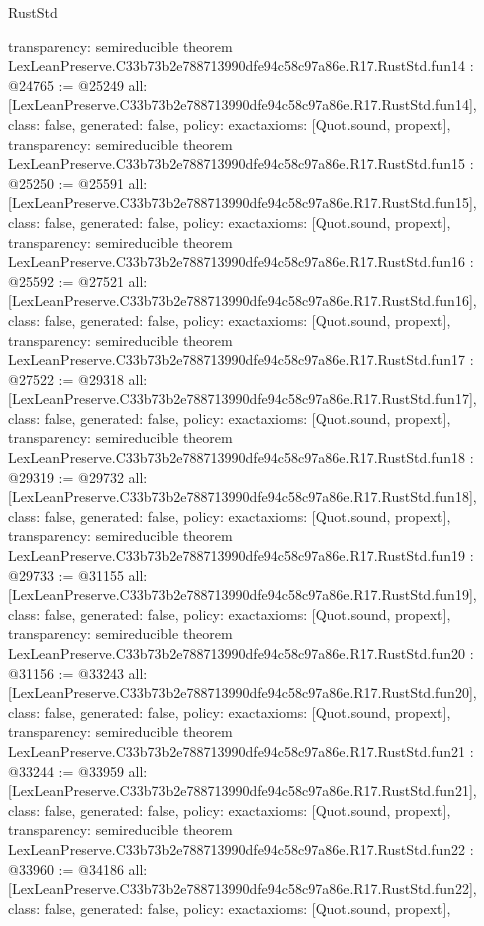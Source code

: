 \begin{lexlean}{RustStd}
\begin{coremodule}
{  transparency: semireducible
}
theorem LexLeanPreserve.C33b73b2e788713990dfe94c58c97a86e.R17.RustStd.fun14 : @24765 := @25249 {
  all: [LexLeanPreserve.C33b73b2e788713990dfe94c58c97a86e.R17.RustStd.fun14],
  class: false,
  generated: false,
  policy: exact{axioms: [Quot.sound, propext]},
  transparency: semireducible
}
theorem LexLeanPreserve.C33b73b2e788713990dfe94c58c97a86e.R17.RustStd.fun15 : @25250 := @25591 {
  all: [LexLeanPreserve.C33b73b2e788713990dfe94c58c97a86e.R17.RustStd.fun15],
  class: false,
  generated: false,
  policy: exact{axioms: [Quot.sound, propext]},
  transparency: semireducible
}
theorem LexLeanPreserve.C33b73b2e788713990dfe94c58c97a86e.R17.RustStd.fun16 : @25592 := @27521 {
  all: [LexLeanPreserve.C33b73b2e788713990dfe94c58c97a86e.R17.RustStd.fun16],
  class: false,
  generated: false,
  policy: exact{axioms: [Quot.sound, propext]},
  transparency: semireducible
}
theorem LexLeanPreserve.C33b73b2e788713990dfe94c58c97a86e.R17.RustStd.fun17 : @27522 := @29318 {
  all: [LexLeanPreserve.C33b73b2e788713990dfe94c58c97a86e.R17.RustStd.fun17],
  class: false,
  generated: false,
  policy: exact{axioms: [Quot.sound, propext]},
  transparency: semireducible
}
theorem LexLeanPreserve.C33b73b2e788713990dfe94c58c97a86e.R17.RustStd.fun18 : @29319 := @29732 {
  all: [LexLeanPreserve.C33b73b2e788713990dfe94c58c97a86e.R17.RustStd.fun18],
  class: false,
  generated: false,
  policy: exact{axioms: [Quot.sound, propext]},
  transparency: semireducible
}
theorem LexLeanPreserve.C33b73b2e788713990dfe94c58c97a86e.R17.RustStd.fun19 : @29733 := @31155 {
  all: [LexLeanPreserve.C33b73b2e788713990dfe94c58c97a86e.R17.RustStd.fun19],
  class: false,
  generated: false,
  policy: exact{axioms: [Quot.sound, propext]},
  transparency: semireducible
}
theorem LexLeanPreserve.C33b73b2e788713990dfe94c58c97a86e.R17.RustStd.fun20 : @31156 := @33243 {
  all: [LexLeanPreserve.C33b73b2e788713990dfe94c58c97a86e.R17.RustStd.fun20],
  class: false,
  generated: false,
  policy: exact{axioms: [Quot.sound, propext]},
  transparency: semireducible
}
theorem LexLeanPreserve.C33b73b2e788713990dfe94c58c97a86e.R17.RustStd.fun21 : @33244 := @33959 {
  all: [LexLeanPreserve.C33b73b2e788713990dfe94c58c97a86e.R17.RustStd.fun21],
  class: false,
  generated: false,
  policy: exact{axioms: [Quot.sound, propext]},
  transparency: semireducible
}
theorem LexLeanPreserve.C33b73b2e788713990dfe94c58c97a86e.R17.RustStd.fun22 : @33960 := @34186 {
  all: [LexLeanPreserve.C33b73b2e788713990dfe94c58c97a86e.R17.RustStd.fun22],
  class: false,
  generated: false,
  policy: exact{axioms: [Quot.sound, propext]},
}
\end{coremodule}
\end{lexlean}
